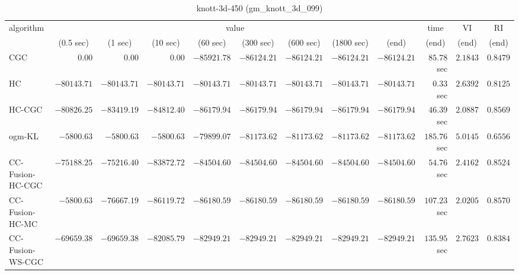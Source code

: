 \begin{table}[H]
\scriptsize
\centering
\caption{knott-3d-450 (gm\_knott\_3d\_099)}
\label{tab:anytimetable-knott-3d-450-gm-knott-3d-099}
\begin{tabular}{lrrrrrrrrrrr}
\toprule
           algorithm &                                   \multicolumn{8}{c}{value} & \multicolumn{1}{c}{time}    & \multicolumn{1}{c}{VI}  & \multicolumn{1}{c}{RI} \\  
\cmidrule(lr){2-9}\cmidrule(lr){10-10} \cmidrule(lr){11-11} \cmidrule(lr){12-12}   
                     & \multicolumn{1}{c}{(0.5 sec)} & \multicolumn{1}{c}{(1 sec)} & \multicolumn{1}{c}{(10 sec)} & \multicolumn{1}{c}{(60 sec)} & \multicolumn{1}{c}{(300 sec)} & \multicolumn{1}{c}{(600 sec)} & \multicolumn{1}{c}{(1800 sec)} & \multicolumn{1}{c}{(end)} & \multicolumn{1}{c}{(end)}    & \multicolumn{1}{c}{(end)}   & \multicolumn{1}{c}{(end)}  \\ \midrule 
                 CGC & $         0.00$ & $         0.00$ & $         0.00$ & $    -85921.78$ & $    -86124.21$ & $    -86124.21$ & $    -86124.21$ & $    -86124.21$ & $        85.78$ sec    & $       2.1843$  & $       0.8479$ \\ 
                  HC & $    -80143.71$ & $    -80143.71$ & $    -80143.71$ & $    -80143.71$ & $    -80143.71$ & $    -80143.71$ & $    -80143.71$ & $    -80143.71$ & $         0.33$ sec    & $       2.6392$  & $       0.8125$ \\ 
              HC-CGC & $    -80826.25$ & $    -83419.19$ & $    -84812.40$ & $    -86179.94$ & $    -86179.94$ & $    -86179.94$ & $    -86179.94$ & $    -86179.94$ & $        46.39$ sec    & $       2.0887$  & $       0.8569$ \\ 
              ogm-KL & $     -5800.63$ & $     -5800.63$ & $     -5800.63$ & $    -79899.07$ & $    -81173.62$ & $    -81173.62$ & $    -81173.62$ & $    -81173.62$ & $       185.76$ sec    & $       5.0145$  & $       0.6556$ \\ 
    CC-Fusion-HC-CGC & $    -75188.25$ & $    -75216.40$ & $    -83872.72$ & $    -84504.60$ & $    -84504.60$ & $    -84504.60$ & $    -84504.60$ & $    -84504.60$ & $        54.76$ sec    & $       2.4162$  & $       0.8524$ \\ 
     CC-Fusion-HC-MC & $     -5800.63$ & $    -76667.19$ & $    -86119.72$ & $    -86180.59$ & $    -86180.59$ & $    -86180.59$ & $    -86180.59$ & $    -86180.59$ & $       107.23$ sec    & $       2.0205$  & $       0.8570$ \\ 
    CC-Fusion-WS-CGC & $    -69659.38$ & $    -69659.38$ & $    -82085.79$ & $    -82949.21$ & $    -82949.21$ & $    -82949.21$ & $    -82949.21$ & $    -82949.21$ & $       135.95$ sec    & $       2.7623$  & $       0.8384$ \\ 

\end{tabular}
\end{table}
